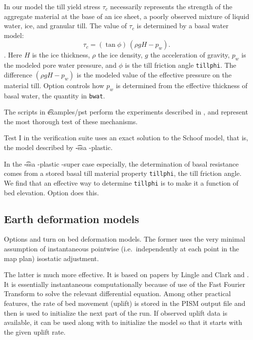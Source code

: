 In our model the till yield stress $\tau_c$ necessarily represents the strength of the aggregate material at the base of an ice sheet, a poorly observed mixture of liquid water, ice, and granular till.  The value of $\tau_c$ is determined by a basal water model:
\begin{equation*}
   \tau_c = (\tan\phi)\,(\rho g H - p_w).
\end{equation*}
\cite[Chapter 8]{Paterson}.  Here $H$ is the ice thickness, $\rho$ the ice density, $g$ the acceleration of gravity, $p_w$ is the modeled pore water pressure, and $\phi$ is the till friction angle \verb|tillphi|.  The difference $(\rho g H - p_w)$ is the modeled value of the effective pressure on the material till.  Option  controls how $p_w$ is determined from the effective thickness of basal water, the quantity in \verb|bwat|.

The scripts in \t{examples/pst} perform the experiments described in \cite{BBssasliding}, and represent the most thorough test of these mechanisms.

Test I in the verification suite uses an exact solution to the Schoof model, that is, the model described by \t{-ssa -plastic}.

In the \t{-ssa -plastic -super} case especially, the determination of basal resistance comes from a stored basal till material property \verb|tillphi|, the till friction angle.  We find that an effective way to determine \verb|tillphi| is to make it a function of bed elevation.  Option  does this.

\subsection{Earth deformation models} \label{subsect:beddef}     Options
 and  turn on bed deformation models.  The former uses the very minimal assumption of instantaneous pointwise (i.e.~independently at each point in the map plan) isostatic adjustment.  

The latter is much more effective.  It is based on papers by Lingle and Clark \cite{LingleClark}  and \cite{BLKfastearth}.  It is essentially instantaneous computationally because of use of the Fast Fourier Transform to solve the relevant differential equation.  Among other practical features, the rate of bed movement (uplift) is stored in the PISM output file and then is used to initialize the next part of the run.  If observed uplift data is available, it can be used along with  to initialize the model so that it starts with the given uplift rate.


